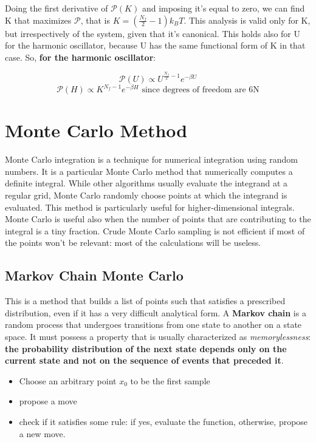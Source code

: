 \documentclass[a4paper, italian, openany]{book}
\begin{document}
Doing the first derivative of $\mathcal{P}(K)$ and imposing it's equal to zero, we can find K that maximizes $\mathcal{P}$, that is $K = \left ( \frac{N_f}{2}-1 \right )k_B T$.\newline
This analysis is valid only for K, but irrespectively of the system, given that it's canonical. This holds also for U for the harmonic oscillator, because U has the same functional form of K in that case. So, \textbf{for the harmonic oscillator}:

$$\mathcal{P}(U) \propto U^{\frac{N_f}{2}-1}e^{-\beta U}$$
$$\mathcal{P}(H) \propto K^{N_f-1}e^{-\beta H} \mbox{ since degrees of freedom are 6N}$$

\section{Monte Carlo Method}

Monte Carlo integration is a technique for numerical integration using random numbers. It is a particular Monte Carlo method that numerically computes a definite integral. While other algorithms usually evaluate the integrand at a regular grid, Monte Carlo randomly choose points at which the integrand is evaluated. This method is particularly useful for higher-dimensional integrals. Monte Carlo is useful also when the number of points that are contributing to the integral is a tiny fraction.\newline
Crude Monte Carlo sampling is not efficient if most of the points won't be relevant: most of the calculations will be useless.

\subsection{Markov Chain Monte Carlo}

This is a method that builds a list of points such that satisfies a prescribed distribution, even if it has a very difficult analytical form. A \textbf{Markov chain} is a random process that undergoes transitions from one state to another on a state space. It must possess a property that is usually characterized as \textit{memorylessness}: \textbf{the probability distribution of the next state depends only on the current state and not on the sequence of events that preceded it}.

\begin{itemize}
\item Choose an arbitrary point $x_0$ to be the first sample
\item propose a move
\item check if it satisfies some rule: if yes, evaluate the function, otherwise, propose a new move.
\end{itemize}
\end{document}
